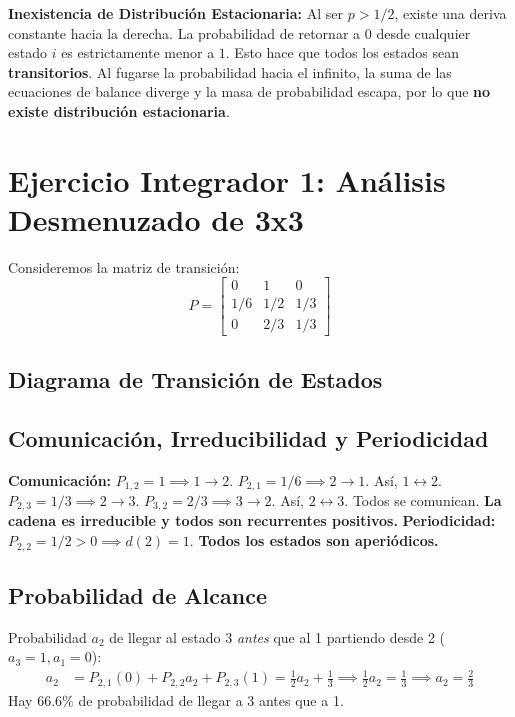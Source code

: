 \documentclass[12pt, a4paper]{article}
\begin{document}
\textbf{Inexistencia de Distribución Estacionaria:}
Al ser $p > 1/2$, existe una deriva constante hacia la derecha. La probabilidad de retornar a $0$ desde cualquier estado $i$ es estrictamente menor a $1$. Esto hace que todos los estados sean \textbf{transitorios}. Al fugarse la probabilidad hacia el infinito, la suma de las ecuaciones de balance diverge y la masa de probabilidad escapa, por lo que \textbf{no existe distribución estacionaria}.

\section{Ejercicio Integrador 1: Análisis Desmenuzado de 3x3}
Consideremos la matriz de transición:
$$ P = \begin{bmatrix} 0 & 1 & 0 \\ 1/6 & 1/2 & 1/3 \\ 0 & 2/3 & 1/3 \end{bmatrix} $$

\subsection{Diagrama de Transición de Estados}
\begin{center}
\end{center}

\subsection{Comunicación, Irreducibilidad y Periodicidad}
\textbf{Comunicación:} $P_{1,2}=1 \implies 1\to 2$. $P_{2,1}=1/6 \implies 2\to 1$. Así, $1\leftrightarrow 2$.
$P_{2,3}=1/3 \implies 2\to 3$. $P_{3,2}=2/3 \implies 3\to 2$. Así, $2\leftrightarrow 3$.
Todos se comunican. \textbf{La cadena es irreducible y todos son recurrentes positivos.}
\textbf{Periodicidad:} $P_{2,2} = 1/2 > 0 \implies d(2)=1$. \textbf{Todos los estados son aperiódicos.}

\subsection{Probabilidad de Alcance}
Probabilidad $a_2$ de llegar al estado 3 \textit{antes} que al 1 partiendo desde 2 ($a_3=1, a_1=0$):
\begin{align}
    a_2 &= P_{2,1}(0) + P_{2,2}a_2 + P_{2,3}(1) = \frac{1}{2}a_2 + \frac{1}{3} \implies \frac{1}{2}a_2 = \frac{1}{3} \implies a_2 = \frac{2}{3}
\end{align}
Hay $66.6\%$ de probabilidad de llegar a 3 antes que a 1.
\end{document}
